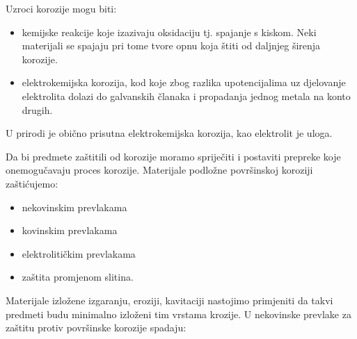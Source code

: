 \documentclass[a4paper,12pt]{article}
\numberwithin{figure}{section}
\begin{document}
Uzroci korozije mogu biti:
\begin{itemize}
\item kemijske reakcije koje izazivaju oksidaciju tj. spajanje s kiskom. Neki materijali se spajaju pri tome tvore opnu koja štiti od daljnjeg širenja korozije. 
\item elektrokemijska korozija, kod koje zbog razlika upotencijalima uz djelovanje elektrolita dolazi do galvanskih članaka i propadanja jednog metala na konto drugih.
\end{itemize}
U prirodi je obično prisutna elektrokemijska korozija, kao elektrolit je uloga. \par
Da bi predmete zaštitili od korozije moramo spriječiti i postaviti prepreke koje onemogučavaju proces korozije. Materijale podložne površinskoj koroziji zaštićujemo:
\begin{itemize}
\item nekovinskim prevlakama
\item kovinskim prevlakama
\item elektrolitičkim prevlakama
\item zaštita promjenom slitina.
\end{itemize} 
Materijale izložene izgaranju, eroziji, kavitaciji nastojimo primjeniti da takvi predmeti budu minimalno izloženi tim vrstama krozije. U nekovinske prevlake za zaštitu protiv površinske korozije spadaju:
\end{document}
